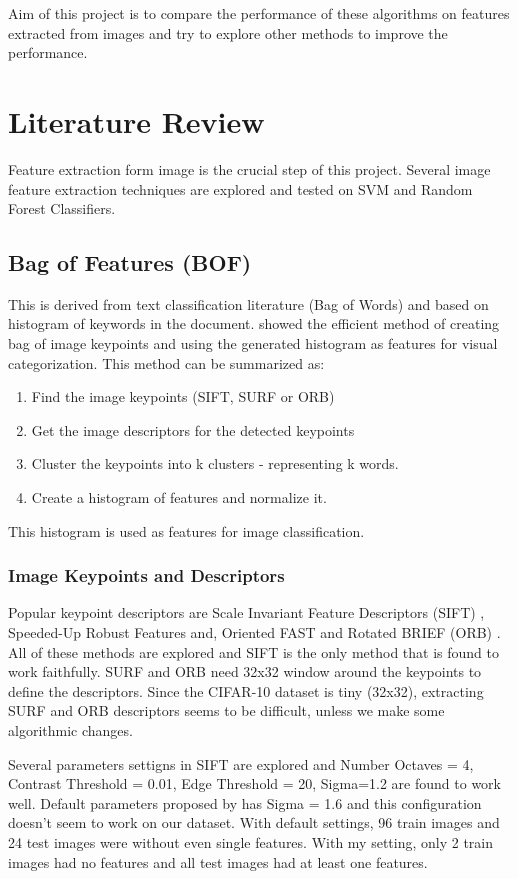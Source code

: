 \documentclass[12pt]{article}
\begin{document}
Aim of this project is to compare the performance of these algorithms on features extracted from images and try to explore other methods to improve the performance.





\section{Literature Review}
Feature extraction form image is the crucial step of this project. Several image feature extraction techniques are explored and tested on SVM and Random Forest Classifiers.
\subsection{Bag of Features (BOF)}
This is derived from text classification literature (Bag of Words) and based on histogram of keywords in the document. \citet{ref:bof} showed the efficient method of creating bag of image keypoints and using the generated histogram as features for visual categorization. This method can be summarized as:
\begin{enumerate}
\item Find the image keypoints (SIFT, SURF or ORB)
\item Get the image descriptors for the detected keypoints
\item Cluster the keypoints into k clusters - representing k words.
\item Create a histogram of features and normalize it.
\end{enumerate}
This histogram is used as features for image classification. 
\subsubsection*{Image Keypoints and Descriptors }\label{sec:bof_lit}
Popular keypoint descriptors are Scale Invariant Feature Descriptors (SIFT) \cite{ref:sift}, Speeded-Up Robust Features \cite{ref:surf} and, Oriented FAST and Rotated BRIEF (ORB) \cite{ref:orb}. All of these methods are explored and SIFT is the only method that is found to work faithfully. SURF and ORB need 32x32 window around the keypoints to define the descriptors. Since the CIFAR-10 dataset is tiny (32x32), extracting SURF and ORB descriptors seems to be difficult, unless we make some algorithmic changes.

Several parameters settigns in SIFT are explored and Number Octaves = 4, Contrast Threshold = 0.01,  Edge Threshold = 20, Sigma=1.2 are found to work well. Default parameters proposed by \citet{ref:sift} has Sigma = 1.6 and this configuration doesn't seem to work on our dataset. With default settings, 96 train images and 24 test images were without even single features. With my setting, only 2 train images had no features and all test images had at least one features.  
\end{document}
